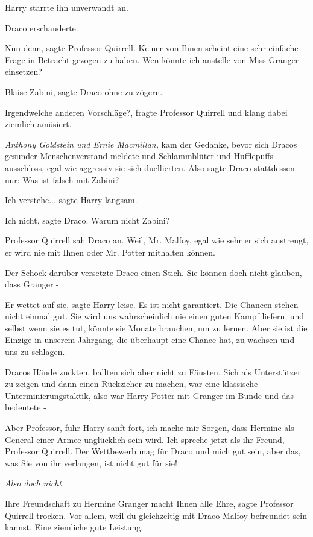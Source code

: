Harry starrte ihn unverwandt an.

Draco erschauderte.

\glqq{}Nun denn\grqq{}, sagte Professor Quirrell. \glqq{} Keiner von Ihnen
scheint eine sehr einfache Frage in Betracht gezogen zu haben. Wen könnte ich
anstelle von Miss Granger einsetzen?\grqq{}

\glqq{}Blaise Zabini\grqq{}, sagte Draco ohne zu zögern.

\glqq{}Irgendwelche anderen Vorschläge?\grqq{}, fragte Professor Quirrell und
klang dabei ziemlich amüsiert.

\emph{Anthony Goldstein und Ernie Macmillan,} kam der Gedanke, bevor sich Dracos
gesunder Menschenverstand meldete und Schlammblüter und Hufflepuffs ausschloss,
egal wie aggressiv sie sich duellierten. Also sagte Draco stattdessen nur:
\glqq{}Was ist falsch mit Zabini?\grqq{}

\glqq{}Ich verstehe...\grqq{} sagte Harry langsam.

\glqq{}Ich nicht\grqq{}, sagte Draco. \glqq{}Warum nicht Zabini?\grqq{}

Professor Quirrell sah Draco an. \glqq{}Weil, Mr. Malfoy, egal wie sehr er sich
anstrengt, er wird nie mit Ihnen oder Mr. Potter mithalten können.\grqq{}

Der Schock darüber versetzte Draco einen Stich. \glqq{}Sie können doch nicht
glauben, dass Granger -\grqq{}

\glqq{}Er wettet auf sie\grqq{}, sagte Harry leise. \glqq{}Es ist nicht
garantiert. Die Chancen stehen nicht einmal gut. Sie wird uns wahrscheinlich nie
einen guten Kampf liefern, und selbst wenn sie es tut, könnte sie Monate
brauchen, um zu lernen. Aber sie ist die Einzige in unserem Jahrgang, die
überhaupt eine Chance hat, zu wachsen und uns zu schlagen.\grqq{}

Dracos Hände zuckten, ballten sich aber nicht zu Fäusten. Sich als Unterstützer
zu zeigen und dann einen Rückzieher zu machen, war eine klassische
Unterminierungstaktik, also war Harry Potter mit Granger im Bunde und das
bedeutete -

\glqq{}Aber Professor\grqq{}, fuhr Harry sanft fort, \glqq{}ich mache mir
Sorgen, dass Hermine als General einer Armee unglücklich sein wird. Ich spreche
jetzt als ihr Freund, Professor Quirrell. Der Wettbewerb mag für Draco und mich
gut sein, aber das, was Sie von ihr verlangen, ist nicht gut für sie!\grqq{}

\emph{Also doch nicht.}

\glqq{}Ihre Freundschaft zu Hermine Granger macht Ihnen alle Ehre\grqq{}, sagte
Professor Quirrell trocken. \glqq{}Vor allem, weil du gleichzeitig mit Draco
Malfoy befreundet sein kannst. Eine ziemliche gute Leistung.\grqq{}


